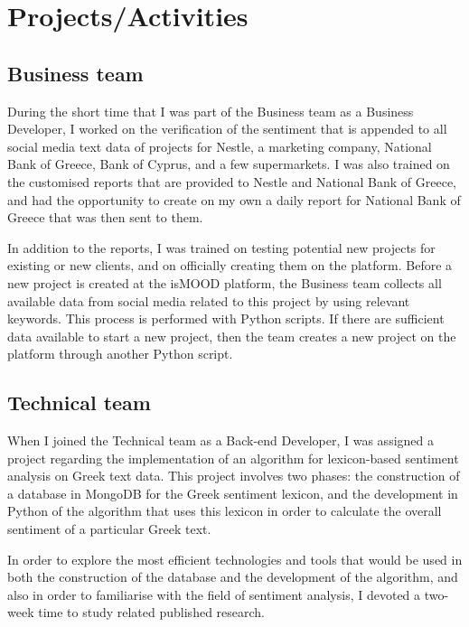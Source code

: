 \section{Projects/Activities}
\label{sec:projects}

\subsection{Business team}
\label{subsec:business-activities}

During the short time that I was part
of the Business team as a Business Developer,
I worked on the verification of the sentiment
that is appended to all social media text data
of projects for Nestle, a marketing company, National Bank of Greece,
Bank of Cyprus, and a few supermarkets.
I was also trained on the customised reports
that are provided to Nestle and National Bank of Greece,
and had the opportunity
to create on my own a daily report for National Bank of Greece
that was then sent to them.

In addition to the reports,
I was trained on testing potential new projects
for existing or new clients,
and on officially creating them on the platform.
Before a new project is created at the isMOOD platform,
the Business team collects all available data from social media
related to this project
by using relevant keywords.
This process is performed with Python scripts.
If there are sufficient data available
to start a new project,
then the team creates a new project on the platform
through another Python script.

\subsection{Technical team}
\label{subsec:technical-activities}

When I joined the Technical team as a Back-end Developer,
I was assigned a project regarding the implementation of an algorithm
for lexicon-based sentiment analysis on Greek text data.
This project involves two phases:
the construction of a database in MongoDB
for the Greek sentiment lexicon,
and the development in Python of the algorithm
that uses this lexicon
in order to calculate the overall sentiment of a particular Greek text.

In order to explore the most efficient technologies and tools
that would be used in both the construction of the database
and the development of the algorithm,
and also in order to familiarise with the field of sentiment analysis,
I devoted a two-week time to study related published research.

